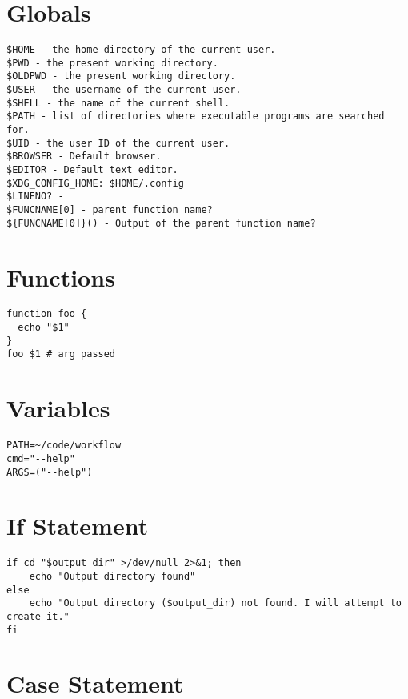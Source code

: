 \section{Globals}

\begin{verbatim}
$HOME - the home directory of the current user.
$PWD - the present working directory.
$OLDPWD - the present working directory.
$USER - the username of the current user.
$SHELL - the name of the current shell.
$PATH - list of directories where executable programs are searched for.
$UID - the user ID of the current user.
$BROWSER - Default browser.
$EDITOR - Default text editor.
$XDG_CONFIG_HOME: $HOME/.config
$LINENO? -
$FUNCNAME[0] - parent function name?
${FUNCNAME[0]}() - Output of the parent function name?
\end{verbatim}

\section{Functions}

\begin{verbatim}
function foo {
  echo "$1"
}
foo $1 # arg passed
\end{verbatim}


\section{Variables}

\begin{verbatim}
PATH=~/code/workflow
cmd="--help"
ARGS=("--help")
\end{verbatim}


\section{If Statement}

\begin{verbatim}
if cd "$output_dir" >/dev/null 2>&1; then
    echo "Output directory found"
else
    echo "Output directory ($output_dir) not found. I will attempt to create it."
fi
\end{verbatim}

\section{Case Statement}

